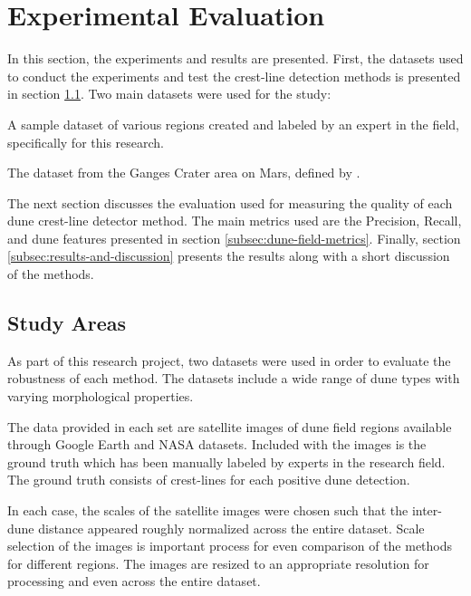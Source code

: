\section{Experimental Evaluation} \label{sec:experimental_evaluation}

In this section, the experiments and results are presented. First, the datasets used to conduct the experiments and test the crest-line detection methods is presented in section \ref{subsec:study-areas}. Two main datasets were used for the study:

\begin{description}[align=left]
	\item[Terrestrial Dataset] A sample dataset of various regions created and labeled by an expert in the field, specifically for this research.
	\item[Mars Dataset] The dataset from the Ganges Crater area on Mars, defined by \cite{vaz_object_based_dune_analysis}.
\end{description}

The next section discusses the evaluation used for measuring the quality of each dune crest-line detector method. The main metrics used are the Precision, Recall, and dune features presented in section \ref{subsec:dune-field-metrics}. Finally, section \ref{subsec:results-and-discussion} presents the results along with a short discussion of the methods. 

\subsection{Study Areas} \label{subsec:study-areas}

As part of this research project, two datasets were used in order to evaluate the robustness of each method. The datasets include a wide range of dune types with varying morphological properties.

The data provided in each set are satellite images of dune field regions available through Google Earth and NASA datasets. Included with the images is the ground truth which has been manually labeled by experts in the research field. The ground truth consists of crest-lines for each positive dune detection.

In each case, the scales of the satellite images were chosen such that the inter-dune distance appeared roughly normalized across the entire dataset. Scale selection of the images is important process for even comparison of the methods for different regions. The images are resized to an appropriate resolution for processing and even across the entire dataset.

